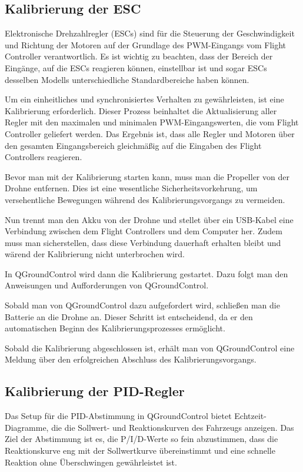 \subsection{Kalibrierung der ESC}
Elektronische Drehzahlregler (ESCs) sind für die Steuerung der Geschwindigkeit und Richtung der Motoren auf der Grundlage des PWM-Eingangs vom Flight Controller verantwortlich. Es ist wichtig zu beachten, dass der Bereich der Eingänge, auf die ESCs reagieren können, einstellbar ist und sogar ESCs desselben Modells unterschiedliche Standardbereiche haben können.

Um ein einheitliches und synchronisiertes Verhalten zu gewährleisten, ist eine Kalibrierung erforderlich. Dieser Prozess beinhaltet die Aktualisierung aller Regler mit den maximalen und minimalen PWM-Eingangswerten, die vom Flight Controller geliefert werden. Das Ergebnis ist, dass alle Regler und Motoren über den gesamten Eingangsbereich gleichmäßig auf die Eingaben des Flight Controllers reagieren.

Bevor man mit der Kalibrierung starten kann, muss man die Propeller von der Drohne entfernen. Dies ist eine wesentliche Sicherheitsvorkehrung, um versehentliche Bewegungen während des Kalibrierungsvorgangs zu vermeiden.

Nun trennt man den Akku von der Drohne und stellet über ein USB-Kabel eine Verbindung zwischen dem Flight Controllers und dem Computer her. Zudem muss man sicherstellen, dass diese Verbindung dauerhaft erhalten bleibt und wärend der Kalibrierung nicht unterbrochen wird.

In QGroundControl wird dann die Kalibrierung gestartet. Dazu folgt man den Anweisungen und Aufforderungen von QGroundControl.

Sobald man von QGroundControl dazu aufgefordert wird, schließen man die Batterie an die Drohne an. Dieser Schritt ist entscheidend, da er den automatischen Beginn des Kalibrierungsprozesses ermöglicht.

Sobald die Kalibrierung abgeschlossen ist, erhält man von QGroundControl eine Meldung über den erfolgreichen Abschluss des Kalibrierungsvorgangs.

\subsection{Kalibrierung der PID-Regler}
Das Setup für die PID-Abstimmung in QGroundControl bietet Echtzeit-Diagramme, die die Sollwert- und Reaktionskurven des Fahrzeugs anzeigen. Das Ziel der Abstimmung ist es, die P/I/D-Werte so fein abzustimmen, dass die Reaktionskurve eng mit der Sollwertkurve übereinstimmt und eine schnelle Reaktion ohne Überschwingen gewährleistet ist.

